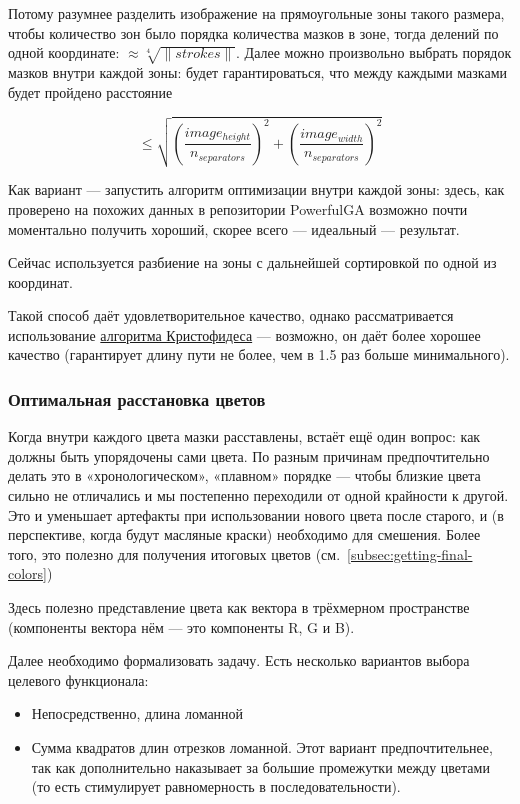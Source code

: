 Потому разумнее разделить изображение на прямоугольные зоны такого размера,
чтобы количество зон было порядка количества мазков в зоне, тогда делений по одной координате: $\approx \sqrt[4]{\lVert strokes \rVert}$.
Далее можно произвольно выбрать порядок мазков внутри каждой зоны: будет гарантироваться, что между каждыми мазками будет пройдено расстояние

\begin{equation}\label{eq:movement_restriction}
    \leq \sqrt{\left( \frac{image_{height}}{n_{separators}} \right)^2 + \left( \frac{image_{width}}{n_{separators}} \right)^2}
\end{equation}

Как вариант — запустить алгоритм оптимизации внутри каждой зоны: здесь, как проверено на похожих данных в репозитории PowerfulGA
возможно почти моментально получить хороший, скорее всего — идеальный — результат.

Сейчас используется разбиение на зоны с дальнейшей сортировкой по одной из координат.

Такой способ даёт удовлетворительное качество, однако рассматривается использование
\href{https://en.wikipedia.org/wiki/Christofides_algorithm}{алгоритма Кристофидеса} —
возможно, он даёт более хорошее качество (гарантирует длину пути не более, чем в 1.5 раз больше минимального).

\subsubsection{Оптимальная расстановка цветов}\label{subsubsec:color-sequence}

Когда внутри каждого цвета мазки расставлены, встаёт ещё один вопрос: как должны быть упорядочены сами цвета.
По разным причинам предпочтительно делать это в «хронологическом», «плавном» порядке — чтобы близкие цвета
сильно не отличались и мы постепенно переходили от одной крайности к другой.
Это и уменьшает артефакты при использовании нового цвета после старого,
и (в перспективе, когда будут масляные краски) необходимо для смешения.
Более того, это полезно для получения итоговых цветов (см.~\ref{subsec:getting-final-colors})

Здесь полезно представление цвета как вектора в трёхмерном пространстве (компоненты вектора нём — это компоненты R, G и B).

Далее необходимо формализовать задачу.
Есть несколько вариантов выбора целевого функционала:
\begin{itemize}
    \item Непосредственно, длина ломанной
    \item Сумма квадратов длин отрезков ломанной.
    Этот вариант предпочтительнее, так как дополнительно наказывает за большие промежутки между цветами
    (то есть стимулирует равномерность в последовательности).
\end{itemize}

